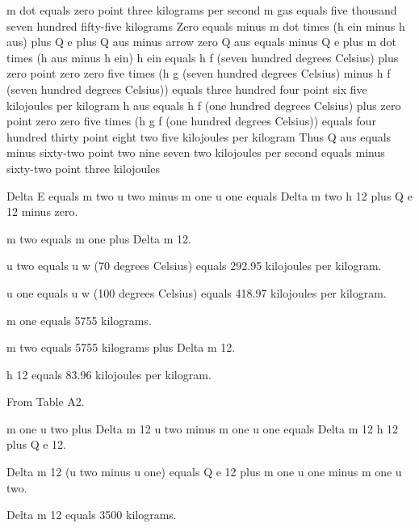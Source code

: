 m dot equals zero point three kilograms per second  
m gas equals five thousand seven hundred fifty-five kilograms  
Zero equals minus m dot times (h ein minus h aus) plus Q e plus Q aus minus arrow zero  
Q aus equals minus Q e plus m dot times (h aus minus h ein)  
h ein equals h f (seven hundred degrees Celsius) plus zero point zero zero five times (h g (seven hundred degrees Celsius) minus h f (seven hundred degrees Celsius)) equals three hundred four point six five kilojoules per kilogram  
h aus equals h f (one hundred degrees Celsius) plus zero point zero zero five times (h g f (one hundred degrees Celsius)) equals four hundred thirty point eight two five kilojoules per kilogram  
Thus Q aus equals minus sixty-two point two nine seven two kilojoules per second equals minus sixty-two point three kilojoules

Delta E equals m two u two minus m one u one equals Delta m two h 12 plus Q e 12 minus zero.

m two equals m one plus Delta m 12.

u two equals u w (70 degrees Celsius) equals 292.95 kilojoules per kilogram.

u one equals u w (100 degrees Celsius) equals 418.97 kilojoules per kilogram.

m one equals 5755 kilograms.

m two equals 5755 kilograms plus Delta m 12.

h 12 equals 83.96 kilojoules per kilogram.

From Table A2.

m one u two plus Delta m 12 u two minus m one u one equals Delta m 12 h 12 plus Q e 12.

Delta m 12 (u two minus u one) equals Q e 12 plus m one u one minus m one u two.

Delta m 12 equals 3500 kilograms.